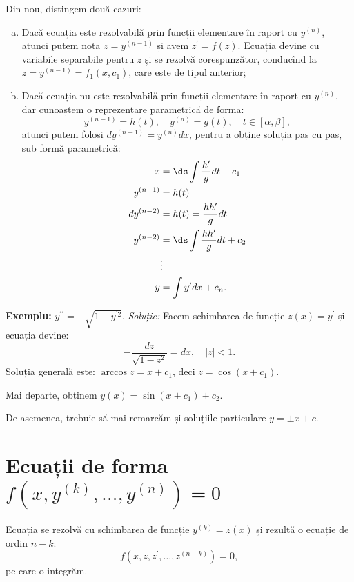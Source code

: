 Din nou, distingem două cazuri:
\begin{enumerate}[(a)]
  \item Dacă ecuația este rezolvabilă prin funcții elementare în raport cu $ y^{(n)} $,
    atunci putem nota $ z = y^{(n-1)} $ și avem $ z^{\prime} = f(z) $. Ecuația devine cu
    variabile separabile pentru $ z $ și se rezolvă corespunzător, conducînd la
  $ z = y^{(n-1)} = f_1(x, c_1) $, care este de tipul anterior;
  \item Dacă ecuația nu este rezolvabilă prin funcții elementare în raport cu
    $ y^{(n)} $, dar cunoaștem o reprezentare parametrică de forma:
    \[
      y^{(n-1)} = h(t), \quad y^{(n)} = g(t), \quad t \in [\alpha, \beta],
    \]
    atunci putem folosi $ dy^{(n-1)} = y^{(n)} dx $, pentru a obține soluția
    pas cu pas, sub formă parametrică:
    \begin{align*}
      x &= \ds\int\frac{h^{\prime}}{g} dt + c_1 \\
      y^{(n-1)} &= h(t) \\
      dy^{(n-2)} &= h(t) = \dfrac{hh^{\prime}}{g} dt \\
      y^{(n-2)} &= \ds\int \frac{hh^{\prime}}{g} dt + c_2 \\
                &\vdots \\
      y &= \int y^{\prime} dx + c_n.
    \end{align*}

\end{enumerate}

\textbf{Exemplu:} $ y^{\prime\prime} = - \sqrt{1 - y^{^{\prime}2}} $.
\emph{Soluție:} Facem schimbarea de funcție $ z(x) = y^{\prime} $ și ecuația devine:
\[
  - \dfrac{dz}{\sqrt{1 - z^2}} = dx, \quad |z| < 1.
\]
Soluția generală este: $ \arccos z = x + c_1 $, deci $ z = \cos(x + c_1) $.

Mai departe, obținem $ y(x) = \sin(x + c_1) + c_2 $.

De asemenea, trebuie să mai remarcăm și soluțiile particulare $ y = \pm x + c $.


\section{Ecuații de forma $ f(x, y^{(k)}, \dots, y^{(n)}) = 0 $}

Ecuația se rezolvă cu schimbarea de funcție $ y^{(k)} = z(x) $ și rezultă
o ecuație de ordin $ n - k $:
\[
  f(x, z, z^{\prime}, \dots, z^{(n-k)}) = 0,
\]
pe care o integrăm.


